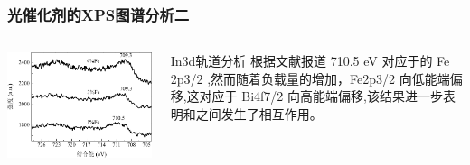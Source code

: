 \documentclass[xetex,compress]{mybeamer}
\begin{document}
\begin{frame}
\frametitle{光催化剂的XPS图谱分析二}
\begin{columns}
\begin{block}{}
\centering
\includegraphics[width=\linewidth]{figures/三氧化二铁2P} 
\end{block}
\begin{block}{In3d轨道分析}
根据文献报道 710.5 eV 对应于的 Fe 2p3/2  ,然而随着负载量的增加，Fe2p3/2 向低能端偏移,这对应于 Bi4f7/2 向高能端偏移,该结果进一步表明和之间发生了相互作用。
\end{block}
\end{columns}
\end{frame}
\end{document}
